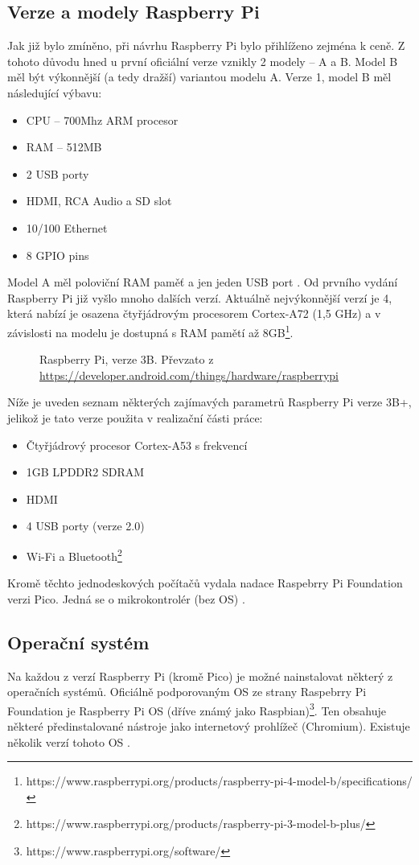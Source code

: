 \subsection*{Verze a modely Raspberry Pi}
Jak již bylo zmíněno, při návrhu Raspberry Pi bylo přihlíženo zejména k ceně. Z tohoto důvodu hned u první oficiální verze vznikly 2 modely -- A a B. Model B měl být výkonnější (a tedy dražší) variantou modelu A. Verze 1, model B měl následující výbavu:
\begin{itemize}
    \item CPU -- 700Mhz ARM procesor
    \item RAM -- 512MB
    \item 2 USB porty
    \item HDMI, RCA Audio a SD slot
    \item 10/100 Ethernet
    \item 8 GPIO pins
\end{itemize}
Model A měl poloviční RAM paměť a jen jeden USB port \cite{RPiBeginning}. Od prvního vydání Raspberry Pi již vyšlo mnoho dalších verzí. Aktuálně nejvýkonnější verzí je 4, která nabízí je osazena čtyřjádrovým procesorem Cortex-A72 (1,5 GHz) a v závislosti na modelu je dostupná s RAM pamětí až 8GB\footnote{https://www.raspberrypi.org/products/raspberry-pi-4-model-b/specifications/}.

\begin{figure}[hbt]
	\centering
	\caption{Raspberry Pi, verze 3B. Převzato z \url{https://developer.android.com/things/hardware/raspberrypi}}
	\label{rpi3}
\end{figure}

Níže je uveden seznam některých zajímavých parametrů Raspberry Pi verze 3B+, jelikož je tato verze použita v realizační části práce:
\begin{itemize}
    \item Čtyřjádrový procesor Cortex-A53 s frekvencí 
    \item 1GB LPDDR2 SDRAM
    \item HDMI
    \item 4 USB porty (verze 2.0)
    \item Wi-Fi a Bluetooth\footnote{https://www.raspberrypi.org/products/raspberry-pi-3-model-b-plus/}
\end{itemize}
Kromě těchto jednodeskových počítačů vydala nadace Raspebrry Pi Foundation verzi Pico. Jedná se o mikrokontrolér (bez OS) \cite{RPiP}.
\subsection*{Operační systém}
Na každou z verzí Raspberry Pi (kromě Pico) je možné nainstalovat některý z operačních systémů. Oficiálně podporovaným OS ze strany Raspebrry Pi Foundation je Raspberry Pi OS (dříve známý jako Raspbian)\footnote{https://www.raspberrypi.org/software/}. Ten obsahuje některé předinstalované nástroje jako internetový prohlížeč (Chromium). Existuje několik verzí tohoto OS \cite{RPiOS}.

